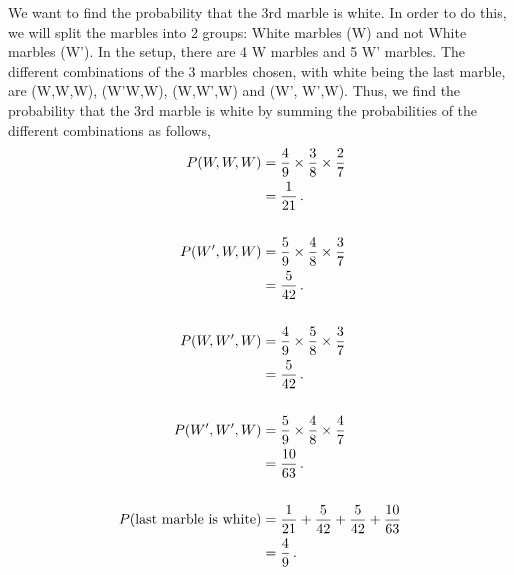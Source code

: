 \begin{subquestions}
\begin{subsubquestions}

\subsubquestion

We want to find the probability that the 3rd marble is white. In order to do this, we will split the marbles into 2 groups: White marbles (W) and not White marbles (W'). In the setup, there are 4 W marbles and 5 W' marbles. The different combinations of the 3 marbles chosen, with white being the last marble, are (W,W,W), (W'W,W), (W,W',W) and (W', W',W). Thus, we find the probability that the 3rd marble is white by summing the probabilities of the different combinations as follows,
\begin{align}
	P(W,W,W) & = \frac{4}{9} \times \frac{3}{8} \times \frac{2}{7} \nonumber \\
	         & = \frac{1}{21} \,. \\ \nonumber \\
	P(W',W,W) & = \frac{5}{9} \times \frac{4}{8} \times \frac{3}{7} \nonumber \\
              & = \frac{5}{42} \,. \\ \nonumber \\
	P(W,W',W) & = \frac{4}{9} \times \frac{5}{8} \times \frac{3}{7} \nonumber \\
			  & = \frac{5}{42} \,. \\ \nonumber \\
	P(W',W',W)& = \frac{5}{9} \times \frac{4}{8} \times \frac{4}{7} \nonumber \\
			  & = \frac{10}{63} \,. \\ \nonumber \\
	P(\text{last marble is white}) & = \frac{1}{21} + \frac{5}{42} + \frac{5}{42} + \frac{10}{63} \nonumber \\
	                               & = \frac{4}{9} \,.
\end{align}

\end{subsubquestions}





\end{subquestions}